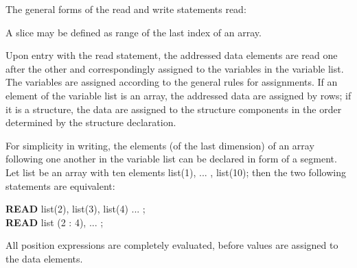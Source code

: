 The general forms of the read and write statements read:




A slice may be defined as range of the last index of an array.










Upon entry with the read statement, the addressed data elements are
read one after the other and correspondingly assigned to the variables
in the variable list. The variables are assigned according to the
general rules for assignments. If an element of the variable list is an
array, the addressed data are assigned by rows; if it is a structure, the
data are assigned to the structure components in the order determined by
the structure declaration.

For simplicity in writing, the elements (of the last dimension) of an
array following one another in the variable list can be declared in form
of a segment. Let list be an array with ten elements list(1), ... ,
list(10); then the two following statements are equivalent:

{\bf READ} list(2), list(3), list(4) ... ;\\
{\bf READ} list (2 : 4), ... ;

All position expressions are completely evaluated, before values are
assigned to the data elements.

